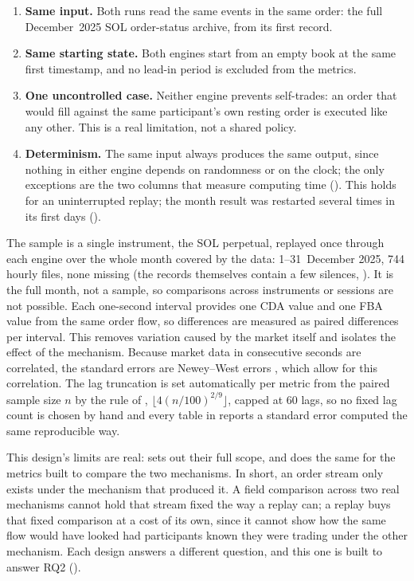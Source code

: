 \begin{enumerate}
  \item \textbf{Same input.} Both runs read the same events in the same order:
  the full December~2025 SOL order-status archive, from its first record.
  \item \textbf{Same starting state.} Both engines start from an empty book at
  the same first timestamp, and no lead-in period is excluded from the
  metrics.
  \item \textbf{One uncontrolled case.} Neither engine prevents self-trades: an
  order that would fill against the same participant's own resting order is
  executed like any other. This is a real limitation, not a shared policy.
  \item \textbf{Determinism.} The same input always produces the same output,
  since nothing in either engine depends on randomness or on the clock; the
  only exceptions are the two columns that measure computing time
  (). This
  holds for an uninterrupted replay; the month result was restarted several
  times in its first days ().
\end{enumerate}

The sample is a single instrument, the SOL perpetual, replayed once through each engine
over the whole month covered by the data: 1--31~December 2025, 744 hourly
files, none missing (the records themselves contain a few silences,
). It is the full month, not a sample, so comparisons across
instruments or sessions are not possible. Each one-second interval provides one
CDA value and one FBA value from the same order flow, so differences are
measured as paired differences per interval. This removes variation caused by
the market itself and isolates the effect of the mechanism. Because market
data in consecutive seconds are correlated, the standard errors are
Newey--West errors \citep{newey1987simple}, which allow for this
correlation. The lag truncation is set automatically per metric from the
paired sample size $n$ by the rule of \citet{newey1994automatic},
$\lfloor 4(n/100)^{2/9} \rfloor$, capped at 60 lags, so no fixed lag
count is chosen by hand and every table in  reports a
standard error computed the same reproducible way.

This design's limits are real:  sets out their full
scope, and  does the same for the metrics
built to compare the two mechanisms. In short, an order stream only
exists under the mechanism that produced it. A field comparison across
two real mechanisms cannot hold that stream fixed the way a replay can;
a replay buys that fixed comparison at a cost of its own, since it
cannot show how the same flow would have looked had participants known
they were trading under the other mechanism. Each design answers a
different question, and this one is built to answer RQ2
().

